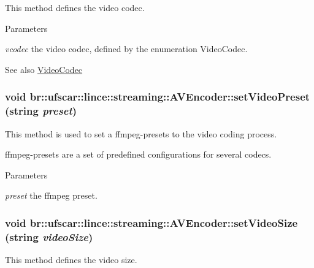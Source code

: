 This method defines the video codec. 


\begin{DoxyParams}{Parameters}
\item[{\em vcodec}]the video codec, defined by the enumeration VideoCodec. \end{DoxyParams}
\begin{DoxySeeAlso}{See also}
\hyperlink{namespacebr_1_1ufscar_1_1lince_1_1streaming_ae620b1e02bc9a1ad45d6e10cd1f87693}{VideoCodec} 
\end{DoxySeeAlso}
\hypertarget{classbr_1_1ufscar_1_1lince_1_1streaming_1_1AVEncoder_acabd65182bbb9d082a28030b79ac9bf1}{
\subsubsection[{setVideoPreset}]{\setlength{\rightskip}{0pt plus 5cm}void br::ufscar::lince::streaming::AVEncoder::setVideoPreset (string {\em preset})}}
\label{classbr_1_1ufscar_1_1lince_1_1streaming_1_1AVEncoder_acabd65182bbb9d082a28030b79ac9bf1}


This method is used to set a ffmpeg-\/presets to the video coding process. 

ffmpeg-\/presets are a set of predefined configurations for several codecs. 
\begin{DoxyParams}{Parameters}
\item[{\em preset}]the ffmpeg preset. \end{DoxyParams}
\hypertarget{classbr_1_1ufscar_1_1lince_1_1streaming_1_1AVEncoder_ad5d69bfba46eea0dfc3105d7fe592191}{
\subsubsection[{setVideoSize}]{\setlength{\rightskip}{0pt plus 5cm}void br::ufscar::lince::streaming::AVEncoder::setVideoSize (string {\em videoSize})}}
\label{classbr_1_1ufscar_1_1lince_1_1streaming_1_1AVEncoder_ad5d69bfba46eea0dfc3105d7fe592191}


This method defines the video size. 


